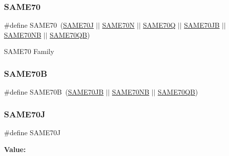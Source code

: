 \subsubsection{\texorpdfstring{SAME70}{SAME70}}
{\footnotesize\ttfamily \#define S\+A\+M\+E70~(\mbox{\hyperlink{group__sam__part__macros__group_gac93b02af1231b0a98fe321369ddc7518}{S\+A\+M\+E70J}} $\vert$$\vert$ \mbox{\hyperlink{group__sam__part__macros__group_gaaf095995f64c3f7f90b0bc0bba4f02c1}{S\+A\+M\+E70N}} $\vert$$\vert$ \mbox{\hyperlink{group__sam__part__macros__group_gabff43edc4525eee01f0a484e6e3996e9}{S\+A\+M\+E70Q}} $\vert$$\vert$ \mbox{\hyperlink{group__sam__part__macros__group_gaae0e6f6fcaa48e35111517b579509e64}{S\+A\+M\+E70\+JB}} $\vert$$\vert$ \mbox{\hyperlink{group__sam__part__macros__group_ga334dbf79ff94d8bf76c1fae1bebb36a0}{S\+A\+M\+E70\+NB}} $\vert$$\vert$ \mbox{\hyperlink{group__sam__part__macros__group_ga1a873ec232758ffa5fae2ba4f925f8f9}{S\+A\+M\+E70\+QB}})}

S\+A\+M\+E70 Family \mbox{\label{group__sam__part__macros__group_gaecbd1afa6c13b4c002054df6c7997a1f}} 
\subsubsection{\texorpdfstring{SAME70B}{SAME70B}}
{\footnotesize\ttfamily \#define S\+A\+M\+E70B~(\mbox{\hyperlink{group__sam__part__macros__group_gaae0e6f6fcaa48e35111517b579509e64}{S\+A\+M\+E70\+JB}} $\vert$$\vert$ \mbox{\hyperlink{group__sam__part__macros__group_ga334dbf79ff94d8bf76c1fae1bebb36a0}{S\+A\+M\+E70\+NB}} $\vert$$\vert$ \mbox{\hyperlink{group__sam__part__macros__group_ga1a873ec232758ffa5fae2ba4f925f8f9}{S\+A\+M\+E70\+QB}})}

\mbox{\label{group__sam__part__macros__group_gac93b02af1231b0a98fe321369ddc7518}} 
\subsubsection{\texorpdfstring{SAME70J}{SAME70J}}
{\footnotesize\ttfamily \#define S\+A\+M\+E70J}

{\bfseries Value\+:}
\begin{DoxyCode}{0}
\DoxyCodeLine{( \(\backslash\)}
\DoxyCodeLine{    )}

\end{DoxyCode}
\mbox{\label{group__sam__part__macros__group_gaae0e6f6fcaa48e35111517b579509e64}} 
